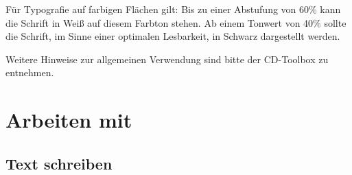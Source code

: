 Für Typografie auf farbigen Flächen gilt: Bis zu einer Abstufung von 60\% kann die Schrift in Weiß auf diesem Farbton stehen. Ab einem Tonwert von 40\% sollte die Schrift, im Sinne einer optimalen Lesbarkeit, in Schwarz dargestellt werden. 

Weitere Hinweise zur allgemeinen Verwendung sind bitte der
CD-Toolbox\cite{toolbox} zu entnehmen.


\section{Arbeiten mit \tubslatex}

\subsection{Text schreiben}





